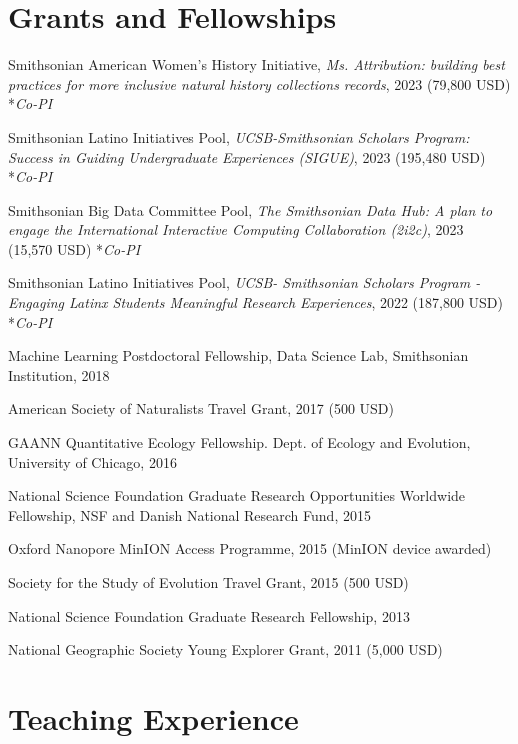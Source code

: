 \documentclass[letterpaper]{article}
\renewenvironment{itemize}{
  \begin{list}{}{
    \setlength{\leftmargin}{1.5em}
  }
}{
  \end{list}
}
\begin{document}
\section*{Grants and Fellowships}
\begin{itemize}
\item Smithsonian American Women's History Initiative, \textit{Ms. Attribution: building best practices for more inclusive natural history collections records}, 2023 (79,800 USD) *\textit{Co-PI}
\item Smithsonian Latino Initiatives Pool, \textit{UCSB-Smithsonian Scholars Program: Success in Guiding Undergraduate Experiences (SIGUE)}, 2023 (195,480 USD) *\textit{Co-PI}
\item Smithsonian Big Data Committee Pool, \textit{The Smithsonian Data Hub: A plan to engage the International Interactive Computing Collaboration (2i2c)}, 2023 (15,570 USD) *\textit{Co-PI}
\item Smithsonian Latino Initiatives Pool, \textit{UCSB- Smithsonian Scholars Program - Engaging Latinx Students Meaningful Research Experiences}, 2022 (187,800 USD) *\textit{Co-PI}
\item Machine Learning Postdoctoral Fellowship, Data Science Lab, Smithsonian Institution, 2018
\item American Society of Naturalists Travel Grant, 2017 (500 USD)
\item GAANN Quantitative Ecology Fellowship. Dept. of Ecology and Evolution, University of Chicago, 2016
\item National Science Foundation Graduate Research Opportunities Worldwide Fellowship, NSF and Danish National Research Fund, 2015
\item Oxford Nanopore MinION Access Programme, 2015 (MinION device awarded)
\item Society for the Study of Evolution Travel Grant, 2015 (500 USD)
\item National Science Foundation Graduate Research Fellowship, 2013
\item National Geographic Society Young Explorer Grant, 2011 (5,000 USD)
\end{itemize}

\section*{Teaching Experience}
\end{document}
